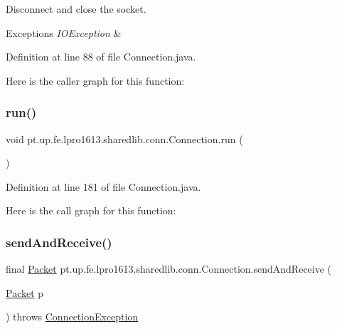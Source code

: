 Disconnect and close the socket.


\begin{DoxyExceptions}{Exceptions}
{\em I\+O\+Exception} & \\
\hline
\end{DoxyExceptions}


Definition at line 88 of file Connection.\+java.

Here is the caller graph for this function\+:
\hypertarget{classpt_1_1up_1_1fe_1_1lpro1613_1_1sharedlib_1_1conn_1_1_connection_ad2971acbca89cf81dcb5fe0ece0a53c4}{}\label{classpt_1_1up_1_1fe_1_1lpro1613_1_1sharedlib_1_1conn_1_1_connection_ad2971acbca89cf81dcb5fe0ece0a53c4} 
\subsubsection{\texorpdfstring{run()}{run()}}
{\footnotesize\ttfamily void pt.\+up.\+fe.\+lpro1613.\+sharedlib.\+conn.\+Connection.\+run (\begin{DoxyParamCaption}{ }\end{DoxyParamCaption})}



Definition at line 181 of file Connection.\+java.

Here is the call graph for this function\+:
\hypertarget{classpt_1_1up_1_1fe_1_1lpro1613_1_1sharedlib_1_1conn_1_1_connection_ac70216d1f9f5ed2c8b29431b10108620}{}\label{classpt_1_1up_1_1fe_1_1lpro1613_1_1sharedlib_1_1conn_1_1_connection_ac70216d1f9f5ed2c8b29431b10108620} 
\subsubsection{\texorpdfstring{send\+And\+Receive()}{sendAndReceive()}}
{\footnotesize\ttfamily final \hyperlink{classpt_1_1up_1_1fe_1_1lpro1613_1_1sharedlib_1_1conn_1_1_packet}{Packet} pt.\+up.\+fe.\+lpro1613.\+sharedlib.\+conn.\+Connection.\+send\+And\+Receive (\begin{DoxyParamCaption}\item[{\hyperlink{classpt_1_1up_1_1fe_1_1lpro1613_1_1sharedlib_1_1conn_1_1_packet}{Packet}}]{p }\end{DoxyParamCaption}) throws \hyperlink{classpt_1_1up_1_1fe_1_1lpro1613_1_1sharedlib_1_1exceptions_1_1_connection_exception}{Connection\+Exception}}

